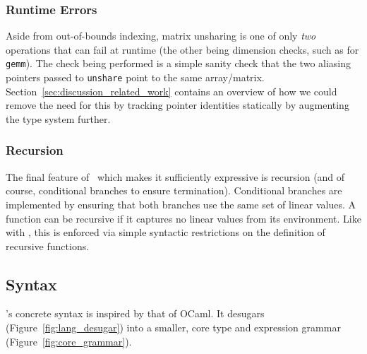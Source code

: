 \subsubsection{Runtime Errors}

Aside from out-of-bounds indexing, matrix unsharing is one of only \emph{two}
operations that can fail at runtime (the other being dimension checks, such as
for \texttt{gemm}). The check being performed is a simple sanity check that the
two aliasing pointers passed to \texttt{unshare} point to the same array/matrix.
Section~\ref{sec:discussion_related_work} contains an overview of how we could
remove the need for this by tracking pointer identities statically by
augmenting the type system further.

\subsubsection{Recursion}

The final feature of \lang\ which makes it sufficiently expressive is recursion
(and of course, conditional branches to ensure termination). Conditional
branches are implemented by ensuring that both branches use the same set of
linear values. A function can be recursive if it captures no linear values from
its environment. Like with , this is enforced via simple syntactic
restrictions on the definition of recursive functions.

\subsection{Syntax}\label{subsec:syntax}

\lang's concrete syntax is inspired by that of OCaml. It desugars
(Figure~\ref{fig:lang_desugar}) into a smaller, core type and expression
grammar (Figure~\ref{fig:core_grammar}).

